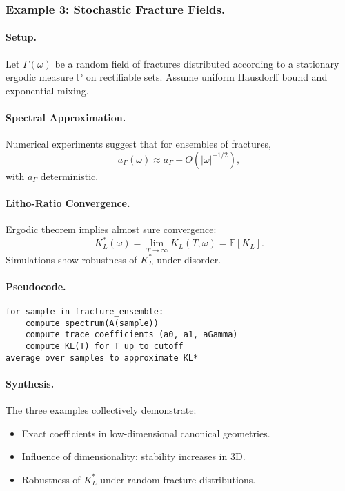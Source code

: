 
\subsubsection{Example 3: Stochastic Fracture Fields.}

\paragraph{Setup.}
Let $\Gamma(\omega)$ be a random field of fractures distributed
according to a stationary ergodic measure $\mathbb{P}$ on rectifiable
sets. Assume uniform Hausdorff bound and exponential mixing.

\paragraph{Spectral Approximation.}
Numerical experiments suggest that for ensembles of fractures,
\[
a_\Gamma(\omega) \approx \overline{a_\Gamma} + O(|\omega|^{-1/2}),
\]
with $\overline{a_\Gamma}$ deterministic.

\paragraph{Litho-Ratio Convergence.}
Ergodic theorem implies almost sure convergence:
\[
K_L^*(\omega) = \lim_{T\to\infty} K_L(T,\omega) = \mathbb{E}[K_L].
\]
Simulations show robustness of $K_L^*$ under disorder.

\paragraph{Pseudocode.}
\begin{verbatim}
for sample in fracture_ensemble:
    compute spectrum(A(sample))
    compute trace coefficients (a0, a1, aGamma)
    compute KL(T) for T up to cutoff
average over samples to approximate KL*
\end{verbatim}


\paragraph{Synthesis.}
The three examples collectively demonstrate:
\begin{itemize}
\item Exact coefficients in low-dimensional canonical geometries.
\item Influence of dimensionality: stability increases in 3D.
\item Robustness of $K_L^*$ under random fracture distributions.
\end{itemize}

